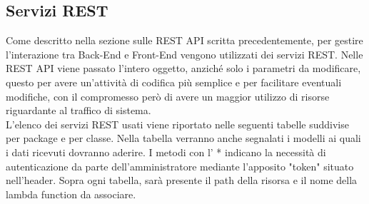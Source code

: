 \documentclass[../DefinizioneDiProdotto_v3.0.0.tex]{subfiles}
\begin{document}
\clearpage
\subsection{Servizi REST}
Come descritto nella sezione sulle REST API scritta precedentemente, per
gestire l'interazione tra Back-End e Front-End vengono utilizzati dei servizi REST. Nelle
REST API viene passato l'intero oggetto, anziché solo i parametri da modificare, questo
per avere un'attività di codifica più semplice e per facilitare eventuali modifiche, con il
compromesso però di avere un maggior utilizzo di risorse riguardante al traffico di sistema.\\
L'elenco dei servizi REST usati viene riportato nelle seguenti tabelle suddivise per package e per classe.
Nella tabella verranno anche segnalati i modelli ai quali i dati ricevuti dovranno aderire.
I metodi con l' * indicano la necessità di autenticazione da parte dell'amministratore mediante l'apposito "token" situato nell'header.
Sopra ogni tabella, sarà presente il path della risorsa e il nome della lambda function da associare.
\end{document}
